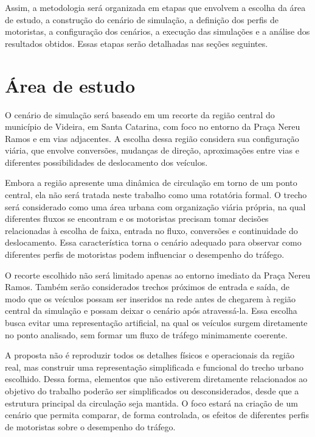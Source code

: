 Assim, a metodologia será organizada em etapas que envolvem a escolha da área de estudo, a construção do cenário de simulação, a definição dos perfis de motoristas, a configuração dos cenários, a execução das simulações e a análise dos resultados obtidos. Essas etapas serão detalhadas nas seções seguintes.

\section{Área de estudo}

O cenário de simulação será baseado em um recorte da região central do município de Videira, em Santa Catarina, com foco no entorno da Praça Nereu Ramos e em vias adjacentes. A escolha dessa região considera sua configuração viária, que envolve conversões, mudanças de direção, aproximações entre vias e diferentes possibilidades de deslocamento dos veículos.

Embora a região apresente uma dinâmica de circulação em torno de um ponto central, ela não será tratada neste trabalho como uma rotatória formal. O trecho será considerado como uma área urbana com organização viária própria, na qual diferentes fluxos se encontram e os motoristas precisam tomar decisões relacionadas à escolha de faixa, entrada no fluxo, conversões e continuidade do deslocamento. Essa característica torna o cenário adequado para observar como diferentes perfis de motoristas podem influenciar o desempenho do tráfego.

O recorte escolhido não será limitado apenas ao entorno imediato da Praça Nereu Ramos. Também serão considerados trechos próximos de entrada e saída, de modo que os veículos possam ser inseridos na rede antes de chegarem à região central da simulação e possam deixar o cenário após atravessá-la. Essa escolha busca evitar uma representação artificial, na qual os veículos surgem diretamente no ponto analisado, sem formar um fluxo de tráfego minimamente coerente.

A proposta não é reproduzir todos os detalhes físicos e operacionais da região real, mas construir uma representação simplificada e funcional do trecho urbano escolhido. Dessa forma, elementos que não estiverem diretamente relacionados ao objetivo do trabalho poderão ser simplificados ou desconsiderados, desde que a estrutura principal da circulação seja mantida. O foco estará na criação de um cenário que permita comparar, de forma controlada, os efeitos de diferentes perfis de motoristas sobre o desempenho do tráfego.

